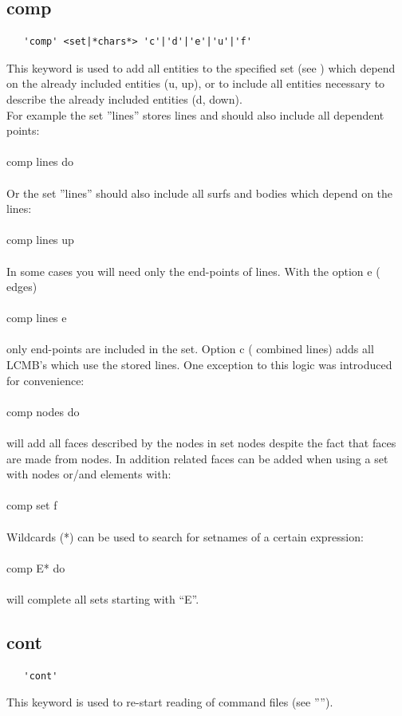 \documentclass{article}
\begin{document}
\subsection{\label{comp}comp}
\begin{verbatim}
   'comp' <set|*chars*> 'c'|'d'|'e'|'u'|'f'
\end{verbatim}
This keyword is used to add all entities to the specified set (see
) which depend on the already included entities (u, up),
or to include all entities necessary to describe the already included entities
(d, down).\\For example the set ''lines'' stores lines and should also include
all dependent points:\\\\comp lines do\\\\Or the set ''lines'' should also
include all surfs and bodies which depend on the lines:\\\\comp lines up\\\\In
some cases you will need only the end-points of lines. With the option e (
edges)\\\\comp lines e\\\\ only end-points are included in the set. Option c (
combined lines) adds all LCMB's which use the stored lines. One exception to this logic was introduced for convenience:\\\\comp nodes do\\\\will add all faces described by the nodes in set nodes despite the fact that faces are made from nodes. In addition related faces can be added when using a set with nodes or/and elements with:\\\\comp set f\\\\

Wildcards (*) can be used to search for setnames of a certain expression:\\\\comp E* do\\\\will complete all sets starting with ``E''.

\subsection{\label{cont}cont}
\begin{verbatim}
   'cont'
\end{verbatim}
This keyword is used to re-start reading of command files (see '''').
\end{document}
